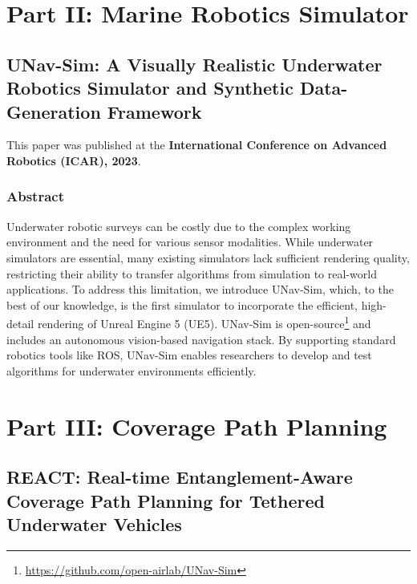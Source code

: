 \documentclass[
10pt, %
b5paper, %
twoside, %
openright  %
]{book}  %
\begin{document}
\part*{Part II: Marine Robotics Simulator}
 \label{partII:paper}



\chapter{UNav-Sim: A Visually Realistic Underwater Robotics Simulator and Synthetic Data-Generation Framework}
\vspace{1cm}
This paper was published at the \textbf{International Conference on Advanced Robotics (ICAR), 2023}.

 \section{Abstract}
Underwater robotic surveys can be costly due to the complex working environment and the need for various sensor modalities. While underwater simulators are essential, many existing simulators lack sufficient rendering quality, restricting their ability to transfer algorithms from simulation to real-world applications. To address this limitation, we introduce UNav-Sim, which, to the best of our knowledge, is the first simulator to incorporate the efficient, high-detail rendering of Unreal Engine 5 (UE5). UNav-Sim is open-source\footnote{\url{https://github.com/open-airlab/UNav-Sim}} and includes an autonomous vision-based navigation stack. By supporting standard robotics tools like ROS, UNav-Sim enables researchers to develop and test algorithms for underwater environments efficiently.

\newpage 

 



\part*{Part III: Coverage Path Planning}


\chapter{REACT: Real-time Entanglement-Aware Coverage
Path Planning for Tethered Underwater Vehicles}
\vspace{1cm}
\end{document}
